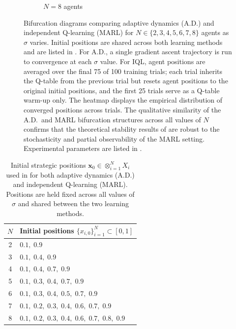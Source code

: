 \documentclass{article}
\begin{document}
\begin{figure}[ht!]
\begin{subfigure}[b]{.47\linewidth}
                    \caption{$N = 8$ agents}
                    \label{fig:marl_bifurcation:g}
                \end{subfigure}
                \caption{Bifurcation diagrams comparing adaptive dynamics (A.D.) and independent Q-learning (MARL) for $N \in \{2,3,4,5,6,7,8\}$ agents as $\sigma$ varies. Initial positions are shared across both learning methods and are listed in . For A.D., a single gradient ascent trajectory is run to convergence at each $\sigma$ value. For IQL, agent positions are averaged over the final 75 of 100 training trials; each trial inherits the Q-table from the previous trial but resets agent positions to the original initial positions, and the first 25 trials serve as a Q-table warm-up only. The heatmap displays the empirical distribution of converged positions across trials. The qualitative similarity of the A.D.\ and MARL bifurcation structures across all values of $N$ confirms that the theoretical stability results of  are robust to the stochasticity and partial observability of the MARL setting. Experimental parameters are listed in .}
                \label{fig:marl_bifurcation}
            \end{figure}

            \begin{table}[ht!]
                \centering
                \caption{Initial strategic positions $\mathbf{x}_0 \in \otimes_{i=1}^N X_i$ used in  for both adaptive dynamics (A.D.) and independent Q-learning (MARL). Positions are held fixed across all values of $\sigma$ and shared between the two learning methods.}
                \label{tab:SI_marl_initial_conditions}
                \begin{tabular}{cl}
                    \toprule
                    $N$ & Initial positions $\{x_{i,0}\}_{i=1}^N \subset [0,1]$ \\
                    \midrule
                    2 & $0.1,\; 0.9$ \\
                    3 & $0.1,\; 0.4,\; 0.9$ \\
                    4 & $0.1,\; 0.4,\; 0.7,\; 0.9$ \\
                    5 & $0.1,\; 0.3,\; 0.4,\; 0.7,\; 0.9$ \\
                    6 & $0.1,\; 0.3,\; 0.4,\; 0.5,\; 0.7,\; 0.9$ \\
                    7 & $0.1,\; 0.2,\; 0.3,\; 0.4,\; 0.6,\; 0.7,\; 0.9$ \\
                    8 & $0.1,\; 0.2,\; 0.3,\; 0.4,\; 0.6,\; 0.7,\; 0.8,\; 0.9$ \\
                    \bottomrule
                \end{tabular}
            \end{table}
\end{document}
